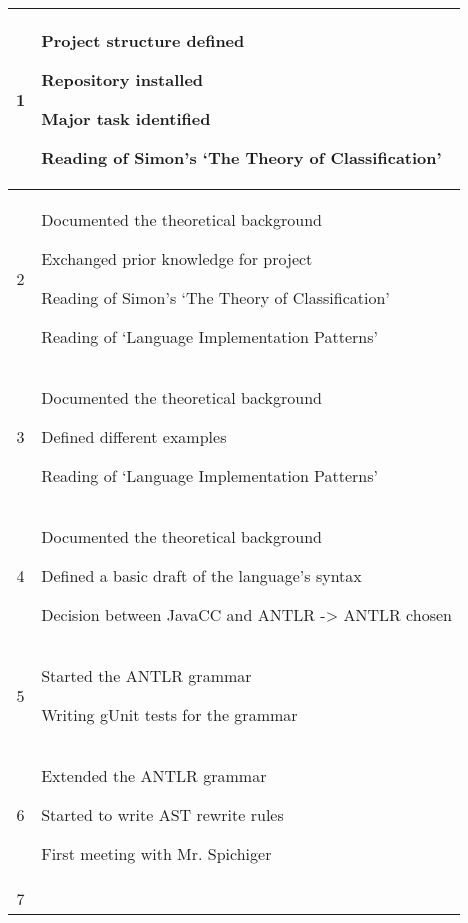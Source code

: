 \begin{center}
\begin{longtable}{|c|p{12cm}|}
1 &
\begin{journal}
	\item Project structure defined
	\item Repository installed
	\item Major task identified
	\item Reading of Simon's `The Theory of Classification'
\end{journal}
\\ \hline
2 &
\begin{journal}
	\item Documented the theoretical background
	\item Exchanged prior knowledge for project
	\item Reading of Simon's `The Theory of Classification'
	\item Reading of `Language Implementation Patterns'
\end{journal}
\\ \hline
3 &
\begin{journal}
	\item Documented the theoretical background
	\item Defined different examples
	\item Reading of `Language Implementation Patterns'
\end{journal}
\\ \hline
4 &
\begin{journal}
	\item Documented the theoretical background
	\item Defined a basic draft of the language's syntax
	\item Decision between JavaCC and ANTLR -> ANTLR chosen
\end{journal}
\\ \hline
5 &
\begin{journal}
	\item Started the ANTLR grammar
	\item Writing gUnit tests for the grammar
\end{journal}
\\ \hline
6 &
\begin{journal}
	\item Extended the ANTLR grammar
	\item Started to write AST rewrite rules
	\item First meeting with Mr. Spichiger
\end{journal}
\\ \hline
7 &
\begin{journal}

\end{journal}
\end{longtable}
\end{center}
